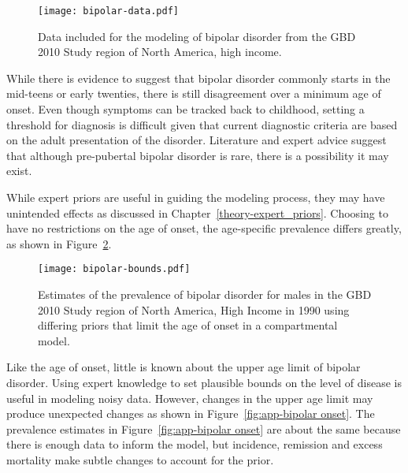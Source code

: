     \begin{figure}[h]
        \begin{center}
            \texttt{[image: bipolar-data.pdf]}
            \caption{Data included for the modeling of bipolar
              disorder from the GBD 2010 Study region of North America,
              high income.}
            \label{fig:app-bipolar data}
        \end{center}
    \end{figure}

While there is evidence to suggest that bipolar disorder commonly
starts in the mid-teens or early twenties, there is still disagreement
over a minimum age of onset.  Even though symptoms can be tracked back
to childhood, setting a threshold for diagnosis is difficult given
that current diagnostic criteria are based on the adult presentation of
the disorder.  Literature and expert advice suggest that although
pre-pubertal bipolar disorder is rare, there is a possibility it may
exist. \cite{kloos_bipolar_2011, angst_historical_2000}

While expert priors are useful in guiding the modeling process, they
may have unintended effects as discussed in Chapter~\ref{theory-expert_priors}.
Choosing to have no restrictions on the
age of onset, the age-specific prevalence differs greatly, as shown in
Figure~\ref{fig:app-bipolar bounds}.

    \begin{figure}[h]
        \begin{center}
            \texttt{[image: bipolar-bounds.pdf]}
            \caption{Estimates of the prevalence of bipolar disorder
              for males in the GBD 2010 Study region of North America, High Income
              in 1990 using differing priors that limit the age of onset
              in a compartmental model.}
            \label{fig:app-bipolar bounds}
        \end{center}
    \end{figure}

Like the age of onset, little is known about the upper age limit of
bipolar disorder.  Using expert knowledge to set plausible bounds on the
level of disease is useful in modeling noisy data.  However, changes in the upper age
limit may produce unexpected changes as shown in Figure~\ref{fig:app-bipolar onset}.
The prevalence estimates in Figure~\ref{fig:app-bipolar onset} are about
the same because there is enough data to inform the model, but incidence,
remission and excess mortality make subtle changes to account for the prior.


